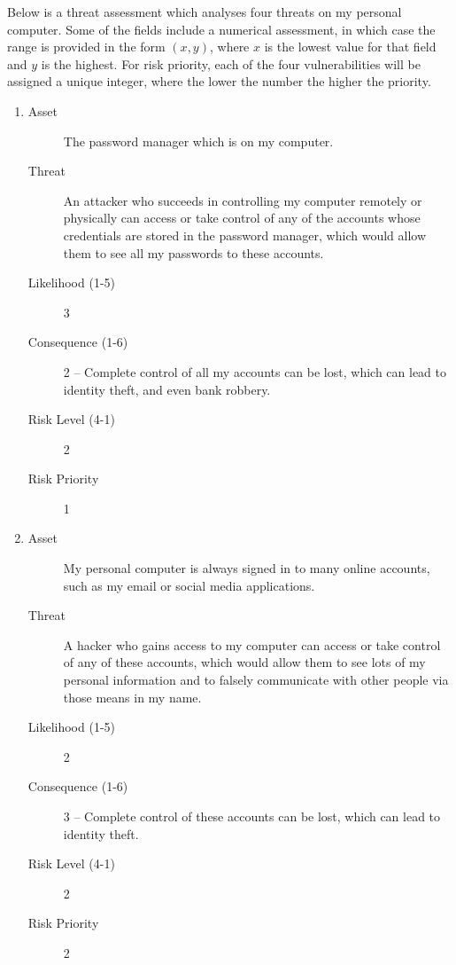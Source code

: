 \documentclass{article}
\begin{document}
Below is a threat assessment which analyses four threats on my personal computer. Some of the fields include a numerical assessment, in which case the range is provided in the form \((x, y)\), where \(x\) is the lowest value for that field and \(y\) is the highest. For risk priority, each of the four vulnerabilities will be assigned a unique integer, where the lower the number the higher the priority.

\begin{enumerate}
	\item
		\begin{description}
			\item[Asset] The password manager which is on my computer.
			\item[Threat] An attacker who succeeds in controlling my computer remotely or physically can access or take control of any of the accounts whose credentials are stored in the password manager, which would allow them to see all my passwords to these accounts.
			\item[Likelihood (1-5)] 3
			\item[Consequence (1-6)] 2 -- Complete control of all my accounts can be lost, which can lead to identity theft, and even bank robbery.
			\item[Risk Level (4-1)] 2
			\item[Risk Priority] 1
		\end{description}

	\item
		\begin{description}
			\item[Asset] My personal computer is always signed in to many online accounts, such as my email or social media applications.
			\item[Threat] A hacker who gains access to my computer can access or take control of any of these accounts, which would allow them to see lots of my personal information and to falsely communicate with other people via those means in my name.
			\item[Likelihood (1-5)] 2
			\item[Consequence (1-6)] 3 -- Complete control of these accounts can be lost, which can lead to identity theft.
			\item[Risk Level (4-1)] 2
			\item[Risk Priority] 2
		\end{description}


\end{enumerate}
\end{document}

